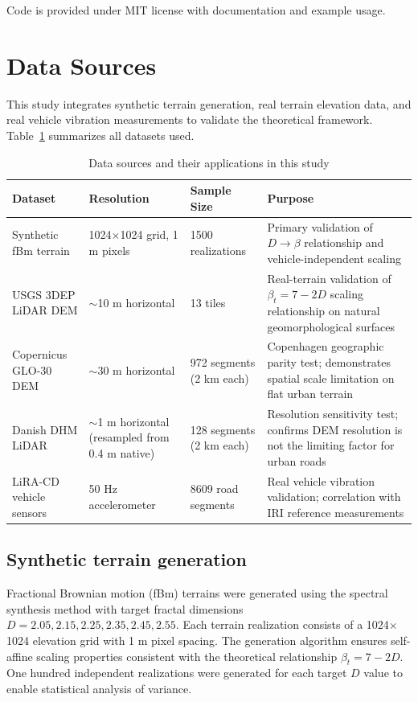 \documentclass[11pt,letterpaper]{article}
\begin{document}
Code is provided under MIT license with documentation and example usage.


\section*{Data Sources}

This study integrates synthetic terrain generation, real terrain elevation data, and real vehicle vibration measurements to validate the theoretical framework. Table~\ref{tab:datasources} summarizes all datasets used.

\begin{table}[h]
\centering
\caption{Data sources and their applications in this study}
\label{tab:datasources}
\small
\begin{tabular}{p{3cm}p{2.5cm}p{2cm}p{6cm}}
\hline
\textbf{Dataset} & \textbf{Resolution} & \textbf{Sample Size} & \textbf{Purpose} \\
\hline
Synthetic fBm terrain & 1024$\times$1024 grid, 1 m pixels & 1500 realizations & Primary validation of $D \rightarrow \beta$ relationship and vehicle-independent scaling \\
\hline
USGS 3DEP LiDAR DEM & $\sim$10 m horizontal & 13 tiles & Real-terrain validation of $\beta_t = 7-2D$ scaling relationship on natural geomorphological surfaces \\
\hline
Copernicus GLO-30 DEM & $\sim$30 m horizontal & 972 segments (2 km each) & Copenhagen geographic parity test; demonstrates spatial scale limitation on flat urban terrain \\
\hline
Danish DHM LiDAR & $\sim$1 m horizontal (resampled from 0.4 m native) & 128 segments (2 km each) & Resolution sensitivity test; confirms DEM resolution is not the limiting factor for urban roads \\
\hline
LiRA-CD vehicle sensors & 50 Hz accelerometer & 8609 road segments & Real vehicle vibration validation; correlation with IRI reference measurements \\
\hline
\end{tabular}
\end{table}

\subsection{Synthetic terrain generation}

Fractional Brownian motion (fBm) terrains were generated using the spectral synthesis method\cite{Musgrave2000} with target fractal dimensions $D = 2.05, 2.15, 2.25, 2.35, 2.45, 2.55$. Each terrain realization consists of a 1024$\times$1024 elevation grid with 1 m pixel spacing. The generation algorithm ensures self-affine scaling properties consistent with the theoretical relationship $\beta_t = 7-2D$. One hundred independent realizations were generated for each target $D$ value to enable statistical analysis of variance.
\end{document}
